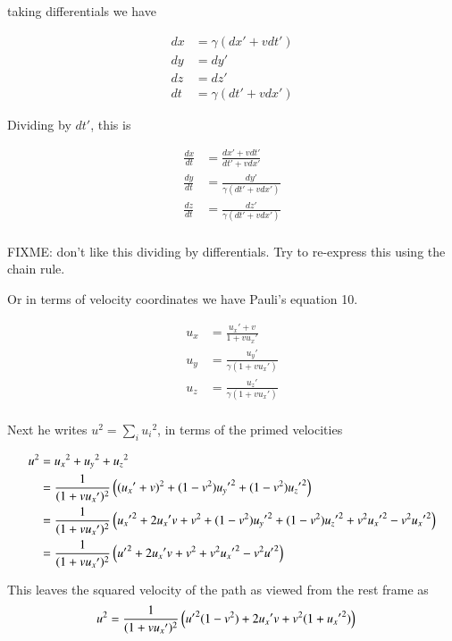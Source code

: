 taking differentials we have

\begin{align*}
dx &= \gamma ( dx' + v dt') \\
dy &= dy' \\
dz &= dz' \\
dt &= \gamma ( dt' + v dx')
\end{align*}

Dividing by $dt'$, this is

\begin{align*}
\frac{dx}{dt} &= \frac{ dx' + v dt' }{ dt' + v dx'} \\
\frac{dy}{dt} &= \frac{dy'}{\gamma (dt' + v dx')} \\
\frac{dz}{dt} &= \frac{dz'}{\gamma (dt' + v dx')} \\
\end{align*}

FIXME: don't like this dividing by differentials.  Try to re-express this 
using the chain rule.

Or in terms of velocity coordinates we have Pauli's equation 10.

\begin{align*}
u_x &= \frac{ {u_x}' + v  }{ 1 + v {u_x}'} \\
u_y &= \frac{{u_y}'}{\gamma (1 + v {u_x}')} \\
u_z &= \frac{{u_z}'}{\gamma (1 + v {u_x}')} \\
\end{align*}

Next he writes $u^2 = \sum_i {u_i}^2$, in terms of the primed velocities

\begin{align*}
u^2 &= {u_x}^2 +{u_y}^2 +{u_z}^2  \\
&=
\frac{1}{( 1 + v {u_x}' )^2 } \left(
( {u_x}' + v  )^2
+(1-v^2){{u_y}'}^2
+(1-v^2){{u_z}'}^2
\right) \\
&=
\frac{1}{( 1 + v {u_x}' )^2 } \left(
{{u_x}'}^2
+ 2 {u_x}' v
+ v^2
+(1-v^2){{u_y}'}^2
+(1-v^2){{u_z}'}^2
+v^2 {{u_x}'}^2
-v^2 {{u_x}'}^2
\right) \\
&=
\frac{1}{( 1 + v {u_x}' )^2 } \left(
{{u}'}^2
+ 2 {u_x}' v
+ v^2
+v^2 {{u_x}'}^2
-v^2 {{u}'}^2
\right) \\
\end{align*}

This leaves the squared velocity of the path as viewed from the rest frame as
\begin{align}\label{eqn:velocity_addition:Usquare}
u^2 &=
\frac{1}{( 1 + v {u_x}' )^2 } \left(
{{u}'}^2(1-v^2)
+ 2 {u_x}' v
+v^2 (1 + {{u_x}'}^2)
\right)
\end{align}

